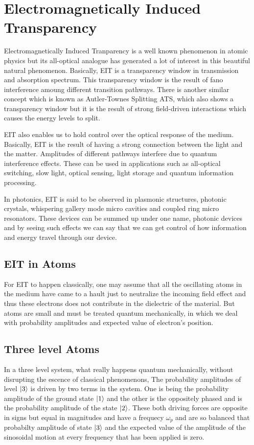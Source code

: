 \section{Electromagnetically Induced Transparency}
Electromagnetically Induced Tranparency is a well known phenomenon in atomic physics but its all-optical analogue has generated a lot of interest in this beautiful natural phenomenon. Basically, EIT is a transparency window in transmission and absorption spectrum. This transparency window is the result of fano interference amoung different transition pathways. There is another similar concept which is known as Autler-Townes Splitting ATS, which also shows a transparency window but it is the result of strong field-driven interactions which causes the energy levels to split.

EIT also enables us to hold control over the optical response of the medium. Basically, EIT is the result of having a strong connection between the light and the matter. Amplitudes of different pathways interfere due to quantum interference effects. These can be used in applications such as all-optical switching, slow light, optical sensing, light storage and quantum information processing.

In photonics, EIT is said to be observed in plasmonic structures, photonic crystals, whispering gallery mode micro cavities and coupled ring micro resonators. These devices can be summed up under one name, photonic devices and by seeing such effects we can say that we can get control of how information and energy travel through our device.

\subsection{EIT in Atoms}
For EIT to happen classically, one may assume that all the oscillating atoms in the medium have came to a hault just to neutralize the incoming field effect and thus these electrons does not contribute in the dielectric of the material. But atoms are small and must be treated quantum mechanically, in which we deal with probability amplitudes and expected value of electron's position. 
\subsection{Three level Atoms}
In a three level system, what really happens quantum mechanically, without disrupting the escence of classical phenomenons, The probability amplitudes of level $\ket{3}$ is driven by two terms in the system. One is being the probability amplitude of the ground state $\ket{1}$ and the other is the oppositely phased and is the probability amplitude of the state $\ket{2}$. These both driving forces are opposite in signs but equal in magnitudes and have a frequecy $\omega_{p}$ and are so balanced that probabilty amplitude of state $\ket{3}$ and the expected value of the amplitude of the sinosoidal motion at every frequency that has been applied is zero. 

